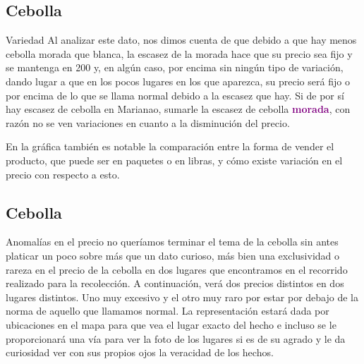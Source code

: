 \subsection{Cebolla}
\begin{frame}[fragile]{Variedad}
  Al analizar este dato, nos dimos cuenta de que debido a que hay menos cebolla morada que blanca, la escasez de la morada hace que su precio sea fijo y se mantenga en 200 y, en algún caso, por encima sin ningún tipo de variación, dando lugar a que en los pocos lugares en los que aparezca, su precio será fijo o por encima de lo que se llama normal debido a la escasez que hay. 
  Si de por sí hay escasez de cebolla en Marianao, sumarle la escasez de cebolla \textbf{\textcolor{purple}{morada}}, con razón no se ven variaciones en cuanto a la disminución del precio.

 En la gráfica también es notable la comparación entre la forma de vender el producto, que puede ser en paquetes o en libras, y cómo existe variación en el precio con respecto a esto.
\end{frame}

\subsection{Cebolla}
\begin{frame}[fragile]{Anomalías en el precio}
  no queríamos terminar el tema de la cebolla sin antes platicar un poco sobre más que un dato curioso, más bien una exclusividad o rareza en el precio de la cebolla en dos lugares que encontramos en el recorrido realizado para la recolección. 
  A continuación, verá dos precios distintos en dos lugares distintos. 
  Uno muy excesivo y el otro muy raro por estar por debajo de la norma de aquello que llamamos normal. 
  La representación estará dada por ubicaciones en el mapa para que vea el lugar exacto del hecho e incluso se le proporcionará una vía para ver la foto de los lugares si es de su agrado y le da curiosidad ver con sus propios ojos la veracidad de los hechos.
\end{frame}


